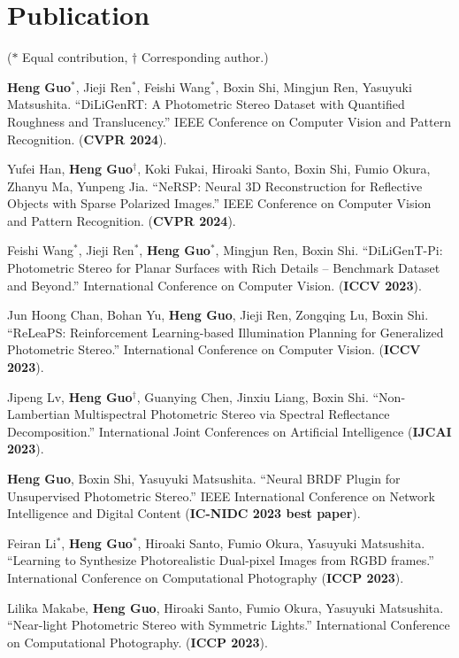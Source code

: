 \documentclass[UTF8]{ctexart}
\begin{document}
\section{Publication}
	($*$ Equal contribution, $\dagger$ Corresponding author.)
\begin{enumerate}[label={[\arabic*]}]
	\item \textbf{Heng Guo}$^*$, Jieji Ren$^*$, Feishi Wang$^*$, Boxin Shi, Mingjun Ren, Yasuyuki Matsushita. ``DiLiGenRT: A Photometric Stereo Dataset with Quantified Roughness and Translucency.'' IEEE Conference on Computer Vision and Pattern Recognition. (\textbf{CVPR 2024}).
	\item Yufei Han, \textbf{Heng Guo$^\dagger$}, Koki Fukai, Hiroaki Santo, Boxin Shi, Fumio Okura, Zhanyu Ma, Yunpeng Jia. ``NeRSP: Neural 3D Reconstruction for Reflective Objects with Sparse Polarized Images.'' IEEE Conference on Computer Vision and Pattern Recognition. (\textbf{CVPR 2024}).
	\item Feishi Wang$^*$, Jieji Ren$^*$, \textbf{Heng Guo}$^*$, Mingjun Ren, Boxin Shi. ``DiLiGenT-Pi: Photometric Stereo for Planar Surfaces with Rich Details – Benchmark Dataset and Beyond.'' International Conference on Computer Vision. (\textbf{ICCV 2023}).
	\item Jun Hoong Chan, Bohan Yu, \textbf{Heng Guo}, Jieji Ren, Zongqing Lu, Boxin Shi. ``ReLeaPS: Reinforcement Learning-based Illumination Planning for Generalized Photometric Stereo.'' International Conference on Computer Vision. (\textbf{ICCV 2023}).
	\item Jipeng Lv, \textbf{Heng Guo$^{\dagger}$}, Guanying Chen, Jinxiu Liang, Boxin Shi. ``Non-Lambertian Multispectral Photometric Stereo via Spectral Reflectance Decomposition.'' International Joint Conferences on Artificial Intelligence (\textbf{IJCAI 2023}).
	\item \textbf{Heng Guo}, Boxin Shi, Yasuyuki Matsushita. ``Neural BRDF Plugin for Unsupervised Photometric Stereo.'' IEEE International Conference on Network Intelligence and Digital Content (\textbf{IC-NIDC 2023 best paper}).
	\item Feiran Li$^*$, \textbf{Heng Guo}$^*$, Hiroaki Santo, Fumio Okura, Yasuyuki Matsushita. ``Learning to Synthesize Photorealistic Dual-pixel Images from RGBD frames.'' International Conference on Computational Photography (\textbf{ICCP 2023}).
	\item Lilika Makabe, \textbf{Heng Guo}, Hiroaki Santo, Fumio Okura, Yasuyuki Matsushita. ``Near-light Photometric Stereo with Symmetric Lights.'' International Conference on Computational Photography. (\textbf{ICCP 2023}).

\end{enumerate}
\end{document}
